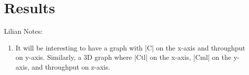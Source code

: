 \chapter{Results}
\label{cha:Results}

Lilian Notes:
\begin{enumerate}
\item It will be interesting to have a graph with |C| on the x-axis and throughput on y-axis. Similarly, a 3D graph where  |Ctl| on the x-axis, |Cml| on the y-axis, and throughput on z-axis.
\end{enumerate}